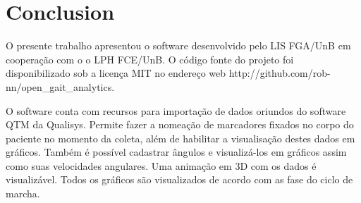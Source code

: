 \documentclass[journal]{IEEEtran}
\begin{document}
%





\section{Conclusion}
O presente trabalho apresentou o software desenvolvido pelo LIS FGA/UnB em cooperação com o o LPH FCE/UnB.
O código fonte do projeto foi disponibilizado sob a licença MIT \cite{MIT2015} no endereço web http://github.com/rob-nn/open\_gait\_analytics.

O software conta com recursos para importação de dados oriundos do software QTM da Qualisys.
Permite fazer a nomeação de marcadores fixados no corpo do paciente no momento da coleta, 
além de habilitar a visualisação destes dados em gráficos. Também é possível cadastrar ângulos
e visualizá-los em gráficos assim como suas velocidades angulares.
Uma animação em 3D com os dados é visualizável. Todos os gráficos são visualizados de acordo com 
as fase do ciclo de marcha.
\end{document}
